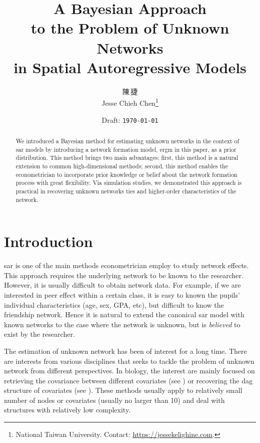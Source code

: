 \documentclass[a4paper]{article}
\title{A Bayesian Approach\\to the Problem of Unknown Networks\\in Spatial Autoregressive Models}
\author{陳\,捷\\Jesse Chieh Chen\thanks{National Taiwan University. Contact: \url{https://jessekelighine.com}.}}
\date{Draft: \texttt{\today}}
\begin{document}
\maketitle

\begin{abstract}
	\noindent
	We introduced a Bayesian method for estimating unknown networks in the context of \acrlong{sar} models
	by introducing a network formation model, \acrlong{ergm} in this paper, as a prior distribution.
	This method brings two main advantages:
	first, this method is a natural extension to common high-dimensional methods;
	second, this method enables the econometrician to incorporate prior knowledge or belief
	about the network formation process with great flexibility.
	Via simulation studies,
	we demonstrated this approach is practical in recovering unknown networks ties and higher-order characteristics
	of the network.
\end{abstract}

\section{Introduction}\label{sec:introduction}

\gls{sar} is one of the main methods econometrician employ to study network effects.
This approach requires the underlying network to be known to the researcher.
However, it is usually difficult to obtain network data.
For example,
if we are interested in peer effect within a certain class,
it is easy to known the pupils' individual characteristics (age, sex, GPA, etc),
but difficult to know the friendship network.
Hence it is natural to extend the canonical \gls{sar} model with known networks to the case where the network is unknown,
but is \emph{believed} to exist by the researcher.

The estimation of unknown network has been of interest for a long time.
There are interests from various disciplines
that seeks to tackle the problem of unknown network from different perspectives.
In biology, the interest are mainly focused on retrieving the covariance between different covariates
(see \cite{yuan-2007})
or recovering the \gls{dag} structure of covariates (see \cite{madigan-1994}).
These methods usually apply to relatively small number of nodes or covariates (usually no larger than 10)
and deal with structures with relatively low complexity.
\end{document}
